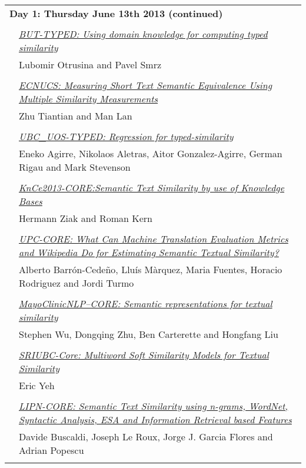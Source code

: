 \begin{tabular}{p{20mm}p{138mm}}
\\
\multicolumn{2}{l}{\bf Day 1: Thursday June 13th 2013 (continued)} \\\\
 & \hyperlink{page.120}{\em BUT-TYPED: Using domain knowledge for computing typed similarity}\\
         & Lubomir Otrusina and Pavel Smrz \\
\\

 & \hyperlink{page.125}{\em ECNUCS: Measuring Short Text Semantic Equivalence Using Multiple Similarity Measurements}\\
         & Zhu Tiantian and Man Lan \\
\\

 & \hyperlink{page.133}{\em UBC\_UOS-TYPED: Regression for typed-similarity}\\
         & Eneko Agirre, Nikolaos Aletras, Aitor Gonzalez-Agirre, German Rigau and Mark Stevenson \\
\\

 & \hyperlink{page.139}{\em KnCe2013-CORE:Semantic Text Similarity by use of Knowledge Bases}\\
         & Hermann Ziak and Roman Kern \\
\\

 & \hyperlink{page.144}{\em UPC-CORE: What Can Machine Translation Evaluation Metrics and Wikipedia Do for Estimating Semantic Textual Similarity?}\\
         & Alberto Barr\'{o}n-Cede\~{n}o, Llu\'{i}s M\`{a}rquez, Maria Fuentes, Horacio Rodriguez and Jordi Turmo \\
\\

 & \hyperlink{page.149}{\em MayoClinicNLP--CORE: Semantic representations for textual similarity}\\
         & Stephen Wu, Dongqing Zhu, Ben Carterette and Hongfang Liu \\
\\

 & \hyperlink{page.156}{\em SRIUBC-Core: Multiword Soft Similarity Models for Textual Similarity}\\
         & Eric Yeh \\
\\

 & \hyperlink{page.163}{\em LIPN-CORE: Semantic Text Similarity using n-grams, WordNet, Syntactic Analysis, ESA and Information Retrieval based Features}\\
         & Davide Buscaldi, Joseph Le Roux, Jorge J. Garcia Flores and Adrian Popescu \\
\\


\end{tabular}
